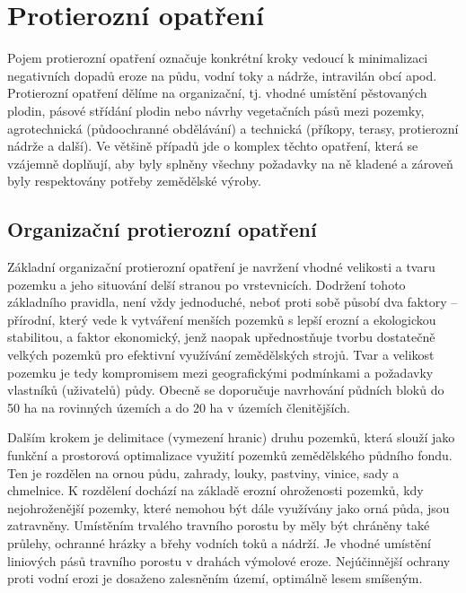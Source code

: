 \section{Protierozní opatření}
Pojem protierozní opatření označuje konkrétní kroky vedoucí k minimalizaci negativních dopadů eroze na půdu, vodní toky a nádrže, intravilán obcí apod. Protierozní opatření dělíme na organizační, tj. vhodné umístění pěstovaných plodin, pásové střídání plodin nebo návrhy vegetačních pásů mezi pozemky, agrotechnická (půdoochranné obdělávání) a technická (příkopy, terasy, protierozní nádrže a další). Ve většině případů jde o komplex těchto opatření, která se vzájemně doplňují, aby byly splněny všechny požadavky na ně kladené a zároveň byly respektovány potřeby zemědělské výroby.

\subsection{Organizační protierozní opatření}
Základní organizační protierozní opatření je navržení vhodné velikosti a tvaru pozemku a jeho situování delší stranou po vrstevnicích. Dodržení tohoto základního pravidla, není vždy jednoduché, neboť proti sobě působí dva faktory – přírodní, který vede k vytváření menších pozemků s lepší erozní a ekologickou stabilitou, a faktor ekonomický, jenž naopak upřednostňuje tvorbu dostatečně velkých pozemků pro efektivní využívání zemědělských strojů. Tvar a velikost pozemku je tedy kompromisem mezi geografickými podmínkami a požadavky vlastníků (uživatelů) půdy. Obecně se doporučuje navrhování půdních bloků do 50 ha na rovinných územích a do 20 ha v územích členitějších.

Dalším krokem je delimitace (vymezení hranic) druhu pozemků, která slouží jako funkční a prostorová optimalizace využití pozemků zemědělského půdního fondu. Ten je rozdělen na ornou půdu, zahrady, louky, pastviny, vinice, sady a chmelnice. K rozdělení dochází na základě erozní ohroženosti pozemků, kdy nejohroženější pozemky, které nemohou být dále využívány jako orná půda, jsou zatravněny. Umístěním trvalého travního porostu by měly být chráněny také průlehy, ochranné hrázky a břehy vodních toků a nádrží. Je vhodné umístění liniových pásů travního porostu v drahách výmolové eroze. Nejúčinnější ochrany proti vodní erozi je dosaženo zalesněním území, optimálně lesem smíšeným.

